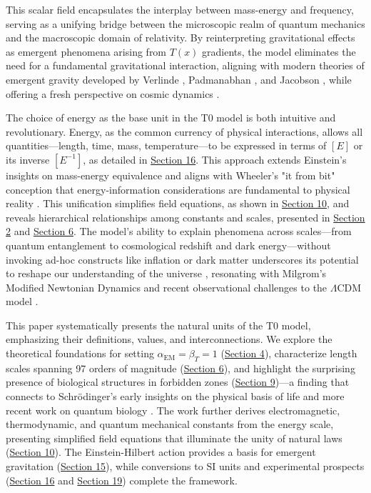 \documentclass[twocolumn,aps,prl]{revtex4-2}
\begin{document}
	This scalar field encapsulates the interplay between mass-energy and frequency, serving as a unifying bridge between the microscopic realm of quantum mechanics and the macroscopic domain of relativity. By reinterpreting gravitational effects as emergent phenomena arising from $T(x)$ gradients, the model eliminates the need for a fundamental gravitational interaction, aligning with modern theories of emergent gravity developed by Verlinde \cite{Verlinde2011}, Padmanabhan \cite{Padmanabhan2012}, and Jacobson \cite{Jacobson1995}, while offering a fresh perspective on cosmic dynamics \cite{pascher_emergente_2025, pascher_part1_2025}.
	
The choice of energy as the base unit in the T0 model is both intuitive and revolutionary. Energy, as the common currency of physical interactions, allows all quantities—length, time, mass, temperature—to be expressed in terms of $[E]$ or its inverse $[E^{-1}]$, as detailed in \hyperref[sec:conversions]{Section 16}. This approach extends Einstein's insights on mass-energy equivalence \cite{Einstein1905b} and aligns with Wheeler's "it from bit" conception that energy-information considerations are fundamental to physical reality \cite{Wheeler1990}. This unification simplifies field equations, as shown in \hyperref[sec:field_equations]{Section 10}, and reveals hierarchical relationships among constants and scales, presented in \hyperref[sec:hierarchy]{Section 2} and \hyperref[sec:length_scales]{Section 6}. The model's ability to explain phenomena across scales—from quantum entanglement to cosmological redshift and dark energy—without invoking ad-hoc constructs like inflation \cite{Guth1981} or dark matter \cite{Rubin1980} underscores its potential to reshape our understanding of the universe \cite{pascher_energiedynamik_2025}, resonating with Milgrom's Modified Newtonian Dynamics \cite{Milgrom1983} and recent observational challenges to the $\Lambda\text{CDM}$ model \cite{Riess2016}.

This paper systematically presents the natural units of the T0 model, emphasizing their definitions, values, and interconnections. We explore the theoretical foundations for setting $\alpha_{\text{EM}} = \beta_T = 1$ (\hyperref[subsec:beta_derivation]{Section 4}), characterize length scales spanning 97 orders of magnitude (\hyperref[sec:length_scales]{Section 6}), and highlight the surprising presence of biological structures in forbidden zones (\hyperref[subsec:bio_anomalies]{Section 9})—a finding that connects to Schrödinger's early insights on the physical basis of life \cite{Schrodinger1944} and more recent work on quantum biology \cite{McFadden2014}. The work further derives electromagnetic, thermodynamic, and quantum mechanical constants from the energy scale, presenting simplified field equations that illuminate the unity of natural laws (\hyperref[sec:field_equations]{Section 10}). The Einstein-Hilbert action provides a basis for emergent gravitation (\hyperref[subsec:gravitation]{Section 15}), while conversions to SI units and experimental prospects (\hyperref[sec:conversions]{Section 16} and \hyperref[sec:outlook]{Section 19}) complete the framework.
\end{document}
